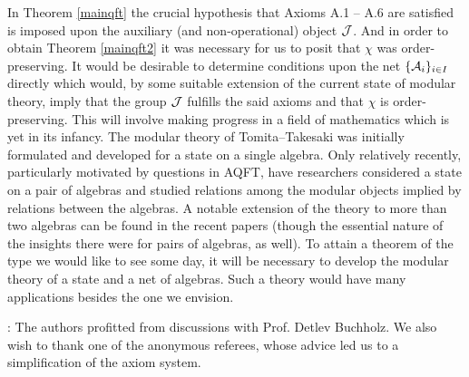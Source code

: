 \documentclass[a4paper,twoside,12pt]{article}
\def\inet{{\{\As_i \}_{i \in I}}}
\def\As{{\cal A}}
\def\Js{{\cal J}}
\begin{document}
     In Theorem \ref{mainqft} the crucial hypothesis that Axioms A.1
-- A.6 are satisfied is imposed upon the auxiliary (and
non-operational) object $\Js$. And in order to obtain Theorem
\ref{mainqft2} it was necessary for us to posit that $\chi$ was
order-preserving. It would be desirable to determine conditions upon
the net $\inet$ directly which would, by some suitable extension of
the current state of modular theory, imply that the group $\Js$
fulfills the said axioms and that $\chi$ is order-preserving. This
will involve making progress in a field of mathematics which is yet in
its infancy. The modular theory of Tomita--Takesaki was initially
formulated and developed for a state on a single algebra. Only
relatively recently, particularly motivated by questions in AQFT, have
researchers considered a state on a pair of algebras and studied
relations among the modular objects implied by relations between the
algebras. A notable extension of the theory to more than two algebras
can be found in the recent papers \cite{Wies,KW} (though the essential
nature of the insights there were for pairs of algebras, as well).  To
attain a theorem of the type we would like to see some day, it will be
necessary to develop the modular theory of a state and a net of
algebras. Such a theory would have many applications besides the one
we envision.

     

\bigskip

:  The authors profitted from discussions
with Prof. Detlev Buchholz. We also wish to thank one of the anonymous
referees, whose advice led us to a simplification of the axiom system. \\
\end{document}
